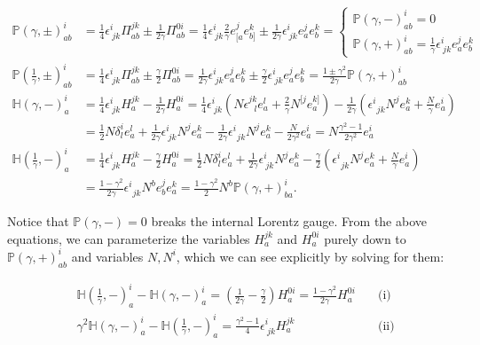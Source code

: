 \documentclass{article}
\begin{document}
$$
\begin{aligned}
\mathbb{P}(\gamma, \pm)^i_{ab} &= \frac{1}{4} \epsilon^i_{\ jk} \Pi^{jk}_{ab} \pm \frac{1}{2\gamma} \Pi^{0i}_{ab} = \frac{1}{4} \epsilon^i_{\ jk} \frac{2}{\gamma} e^j_{[a} e^k_{b]} \pm \frac{1}{2\gamma} \epsilon^i_{\ jk} e^j_a e^k_b =
\begin{cases}
\mathbb{P}(\gamma, -)^i_{ab} = 0 \\
\mathbb{P}(\gamma, +)^i_{ab} = \frac{1}{\gamma} \epsilon^i_{\ jk} e^j_a e^k_b
\end{cases} \\
\mathbb{P}\left(\frac{1}{\gamma}, \pm\right)^i_{ab} &= \frac{1}{4} \epsilon^i_{\ jk} \Pi^{jk}_{ab} \pm \frac{\gamma}{2} \Pi^{0i}_{ab} = \frac{1}{2\gamma} \epsilon^i_{\ jk} e^j_a e^k_b \pm \frac{\gamma}{2} \epsilon^i_{\ jk} e^j_a e^k_b = \frac{1\pm\gamma^2}{2\gamma}\mathbb{P}(\gamma, +)^i_{ab} \\
\mathbb{H}(\gamma, -)^i_a &= \frac{1}{4} \epsilon^i_{\ jk} H^{jk}_a - \frac{1}{2\gamma} H^{0i}_a = \frac{1}{4} \epsilon^i_{\ jk} \left(N \epsilon^{jk}_{\ \ \ l} e_{a}^l + \frac{2}{\gamma} N^{[j} e^{k]}_a\right) - \frac{1}{2\gamma}\left(\epsilon^{i}_{\ \ jk} N^j e_{a}^k + \frac{N}{\gamma} e^i_a\right) \\
&= \frac{1}{2} N \delta^i_l e^l_a + \frac{1}{2\gamma} \epsilon^i_{\ jk} N^j e^k_a - \frac{1}{2\gamma} \epsilon^{i}_{\ \ jk} N^j e_{a}^k - \frac{N}{2\gamma^2}e^i_a = N \frac{\gamma^2 - 1}{2\gamma^2} e^i_a \\
\mathbb{H}\left(\frac{1}{\gamma}, -\right)^i_a &= \frac{1}{4} \epsilon^i_{\ jk} H^{jk}_a - \frac{\gamma}{2} H^{0i}_a = \frac{1}{2} N \delta^i_l e^l_a + \frac{1}{2\gamma} \epsilon^i_{\ jk} N^j e^k_a - \frac{\gamma}{2}\left(\epsilon^{i}_{\ \ jk} N^j e_{a}^k + \frac{N}{\gamma} e^i_a\right) \\
&= \frac{1-\gamma^2}{2\gamma} \epsilon^{i}_{\ \ jk} N^b e^j_b e^k_a = \frac{1 - \gamma^2}{2} N^b \mathbb{P}(\gamma, +)^i_{ba}.
\end{aligned}
$$

Notice that $\mathbb{P}(\gamma, -) = 0$ breaks the internal Lorentz gauge. From the above equations, we can parameterize the variables $H^{jk}_a$ and $H^{0i}_a$ purely down to $\mathbb{P}(\gamma, +)^i_{ab}$ and variables $N, N^i$, which we can see explicitly by solving for them:

$$
\begin{aligned}
&\mathbb{H}\left(\frac{1}{\gamma}, -\right)^i_a - \mathbb{H}(\gamma, -)^i_a = \left(\frac{1}{2\gamma} - \frac{\gamma}{2}\right) H^{0i}_a = \frac{1-\gamma^2}{2\gamma} H^{0i}_a \quad &\text{(i)}\\
&\gamma^2 \mathbb{H}(\gamma, -)^i_a - \mathbb{H}\left(\frac{1}{\gamma}, -\right)^i_a = \frac{\gamma^2 - 1}{4} \epsilon^i_{\ jk} H^{jk}_a \quad &\text{(ii)}
\end{aligned}
$$
\end{document}
